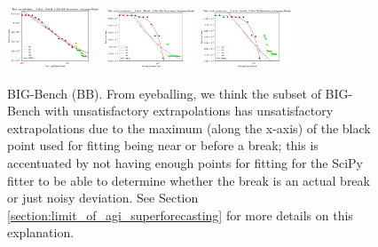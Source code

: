 \documentclass{article} %
\begin{document}
\begin{figure}
\includegraphics[width=0.245\textwidth]{figures/scaling_laws_benchmark_dataset_plots__all_functional_forms/__qa_wikidata_,__2-shot_____262M.png}
\includegraphics[width=0.245\textwidth]{figures/scaling_laws_benchmark_dataset_plots__all_functional_forms/__unit_conversion_,__1-shot_____262M.png}
\includegraphics[width=0.245\textwidth]{figures/scaling_laws_benchmark_dataset_plots__all_functional_forms/__unit_conversion_,__2-shot_____262M.png}

    \caption{
    BIG-Bench (BB). From eyeballing, we think the subset of BIG-Bench with unsatisfactory extrapolations has unsatisfactory extrapolations due to the maximum (along the x-axis) of the black point used for fitting being near or before a break; this is accentuated by not having enough points for fitting for the SciPy fitter to be able to determine whether the break is an actual break or just noisy deviation. See Section \ref{section:limit_of_agi_superforecasting} for more details on this explanation.
    }
    \label{fig:scaling_laws_benchmark_dataset_all_extrapolations__big_bench}
\end{figure}
\end{document}
